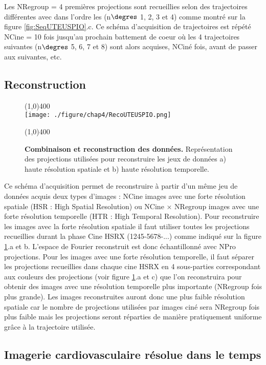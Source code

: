 Les NRegroup = 4 premières projections sont recueillies selon des trajectoires différentes  avec dans l'ordre les (n$\degres$ 1, 2, 3 et 4) comme montré sur la figure \ref{fig:SeqUTEUSPIO}.c. Ce schéma d'acquisition de trajectoires est répété NCine = 10 fois jusqu'au prochain battement de coeur où les 4 trajectoires suivantes (n$\degres$ 5, 6, 7 et 8) sont alors acquises, NCiné fois, avant de passer aux suivantes, etc.

\subsection{Reconstruction}

\begin{figure}[H]
\centering
\line(1,0){400} \\
\texttt{[image: ./figure/chap4/RecoUTEUSPIO.png]}
\caption[Combinaison et reconstruction des données.]{\label{fig:RecoUTEUSPIO} \textbf{Combinaison et reconstruction des données.} Représentation des projections utilisées pour reconstruire les jeux de données a) haute résolution spatiale et b) haute résolution temporelle.}
\line(1,0){400} \\ 
\end{figure}

Ce schéma d'acquisition permet de reconstruire à partir d'un même jeu de données acquis deux types d'images : NCine images avec une forte résolution spatiale (HSR : High Spatial Resolution) ou NCine $\times$ NRegroup images avec une forte résolution temporelle (HTR : High Temporal Resolution). Pour reconstruire les images avec la forte résolution spatiale il faut utiliser toutes les projections recueillies durant la phase Cine HSRX (1245-5678-...) comme indiqué sur la figure \ref{fig:RecoUTEUSPIO}.a et b. L'espace de Fourier reconstruit est donc échantillonné avec NPro projections.
Pour les images avec une forte résolution temporelle, il faut séparer les projections recueillies dans chaque cine HSRX en 4 sous-parties correspondant aux couleurs des projections (voir figure \ref{fig:RecoUTEUSPIO}.a et c) que l'on reconstruira pour obtenir des images avec une résolution temporelle plus importante (NRegroup fois plus grande). Les images reconstruites auront donc une plus faible résolution spatiale car le nombre de projections utilisées par images ciné sera NRegroup fois plus faible mais les projections seront réparties de manière pratiquement uniforme grâce à la trajectoire utilisée.

\subsection{Imagerie cardiovasculaire résolue dans le temps}

